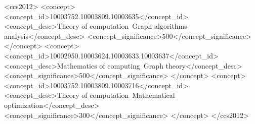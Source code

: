 \documentclass[sigconf
]{acmart}
\theoremstyle{definition}
\begin{document}
\begin{CCSXML}
<ccs2012>
   <concept>
       <concept_id>10003752.10003809.10003635</concept_id>
       <concept_desc>Theory of computation~Graph algorithms analysis</concept_desc>
       <concept_significance>500</concept_significance>
       </concept>
   <concept>
       <concept_id>10002950.10003624.10003633.10003637</concept_id>
       <concept_desc>Mathematics of computing~Graph theory</concept_desc>
       <concept_significance>500</concept_significance>
       </concept>
   <concept>
       <concept_id>10003752.10003809.10003716</concept_id>
       <concept_desc>Theory of computation~Mathematical optimization</concept_desc>
       <concept_significance>300</concept_significance>
       </concept>
 </ccs2012>
\end{CCSXML}

\end{document}

